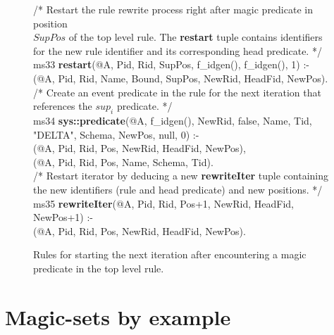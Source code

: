\begin{figure}[!t]
\ssp
\centering
\begin{boxedminipage}{\linewidth}
/* Restart the rule rewrite process right after magic predicate in position  \\
$SupPos$ of the top level rule. The {\bf restart} tuple contains identifiers  \\
for the new rule identifier and its corresponding head predicate. */ \\
ms33 {\bf restart}(@A, Pid, Rid, SupPos, f\_idgen(), f\_idgen(), 1) :- \\
(@A, Pid, Rid, Name, Bound, SupPos, NewRid, HeadFid, NewPos). \\
	
/* Create an event predicate in the rule for the next iteration that  \\
references the $sup_i$ predicate. */ \\
ms34 {\bf sys::predicate}(@A, f\_idgen(), NewRid, false, Name, Tid, "DELTA", Schema, NewPos, null, 0) :- \\
(@A, Pid, Rid, Pos, NewRid, HeadFid, NewPos), \\
(@A, Pid, Rid, Pos, Name, Schema, Tid). \\
	
/* Restart iterator by deducing a new {\bf rewriteIter} tuple containing \\
the new identifiers (rule and head predicate) and new positions. */ \\
ms35 {\bf rewriteIter}(@A, Pid, Rid, Pos+1, NewRid, HeadFid, NewPos+1) :- \\
(@A, Pid, Rid, Pos, NewRid, HeadFid, NewPos). \\

\end{boxedminipage}
\caption{\label{ch:evita:fig:mpgoal}Rules for starting the next iteration after
encountering a magic predicate in the top level rule. }
\end{figure}


\section{Magic-sets by example}


